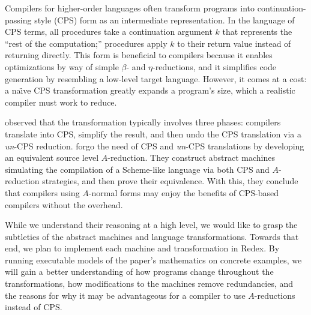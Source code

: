 \documentclass[11pt]{article}
\begin{document}
\thispagestyle{fancy}

Compilers for higher-order languages often transform programs into
continuation-passing style (CPS) form as an intermediate representation. In the
language of CPS terms, all procedures take a continuation argument $k$
that represents the ``rest of the computation;'' procedures apply $k$ to their
return value instead of returning directly. This form is beneficial to
compilers because it enables optimizations by way of simple $\beta$- and
$\eta$-reductions, and it simplifies code generation by resembling a low-level
target language.
However, it comes at a cost: a na\"{\i}ve CPS transformation greatly expands a
program's size, which a realistic compiler must work to reduce.

\citet{Sabry:1992zr} observed that the transformation typically involves three
phases: compilers translate into CPS, simplify the result, and then undo the
CPS translation via a \textit{un}-CPS reduction.
\citet{Flanagan:1993fk} forgo the need of CPS and \textit{un}-CPS translations
by developing an equivalent source level $A$-reduction. They construct abstract
machines simulating the compilation of a Scheme-like language via both CPS and
$A$-reduction strategies, and then prove their equivalence. With this, they
conclude that compilers using $A$-normal forms may enjoy the benefits of
CPS-based compilers without the overhead.


While we understand their reasoning at a high level, we would like to grasp
the subtleties of the abstract machines and language transformations.
Towards that end, we plan to implement each machine and transformation
in Redex. By running executable models of the paper's mathematics on concrete
examples, we will gain a better understanding of how programs change throughout
the transformations, how modifications to the machines remove redundancies, and
the reasons for why it may be advantageous for a compiler to use $A$-reductions
instead of CPS.
\end{document}
